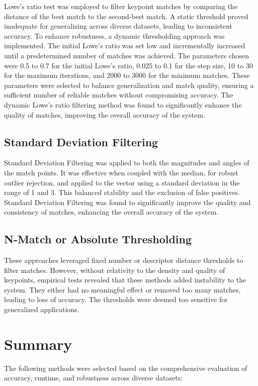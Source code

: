 Lowe's ratio test was employed to filter keypoint matches by comparing the distance of the best match to the second-best match. A static threshold proved inadequate for generalizing across diverse datasets, leading to inconsistent accuracy. To enhance robustness, a dynamic thresholding approach was implemented. The initial Lowe's ratio was set low and incrementally increased until a predetermined number of matches was achieved. The parameters chosen were 0.5 to 0.7 for the initial Lowe's ratio, 0.025 to 0.1 for the step size, 10 to 30 for the maximum iterations, and 2000 to 3000 for the minimum matches. These parameters were selected to balance generalization and match quality, ensuring a sufficient number of reliable matches without compromising accuracy. The dynamic Lowe's ratio filtering method was found to significantly enhance the quality of matches, improving the overall accuracy of the system.


\subsection{Standard Deviation Filtering}

Standard Deviation Filtering was applied to both the magnitudes and angles of the match points. It was effective when coupled with the median, for robust outlier rejection, and applied to the vector using a standard deviation in the range of 1 and 3. This balanced stability and the exclusion of false positives. Standard Deviation Filtering was found to significantly improve the quality and consistency of matches, enhancing the overall accuracy of the system.

\subsection{{N-Match or Absolute Thresholding}}
These approaches leveraged fixed number or descriptor distance thresholds to filter matches. However, without relativity to the density and quality of keypoints, empirical tests revealed that these methods added instability to the system. They either had no meaningful effect or removed too many matches, leading to loss of accuracy. The thresholds were deemed too sensitive for generalized applications. 



\section{Summary}
The following methods were selected based on the comprehensive evaluation of accuracy, runtime, and robustness across diverse datasets:

